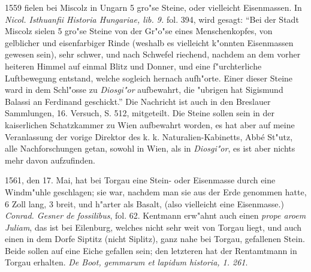 \documentclass[a4paper, 11pt, oneside, polutonikogreek, german]{article}
\begin{document}
1559 fielen bei Miscolz in Ungarn 5 gro"se Steine, oder vielleicht Eisenmassen. In \emph{Nicol. Isthuanfii Historia Hungariae, lib. 9.} fol. 394, wird gesagt: "`Bei der Stadt Miscolz sielen 5 gro"se Steine von der Gr"o"se eines Menschenkopfes, von gelblicher und eisenfarbiger Rinde (weshalb es vielleicht k"onnten Eisenmassen gewesen sein), sehr schwer, und nach Schwefel riechend, nachdem an dem vorher heiteren Himmel auf einmal Blitz und Donner, und eine f"urchterliche Luftbewegung entstand, welche sogleich hernach aufh"orte. Einer dieser Steine ward in dem Schl"osse zu \emph{Diosgi"or} aufbewahrt, die "ubrigen hat Sigismund Balassi an Ferdinand geschickt."' Die Nachricht ist auch in den Breslauer Sammlungen, 16. Versuch, S. 512, mitgeteilt. Die Steine sollen sein in der kaiserlichen Schatzkammer zu Wien aufbewahrt worden, es hat aber auf meine Veranlassung der vorige Direktor des k. k. Naturalien-Kabinetts, Abbé St"utz, alle Nachforschungen getan, sowohl in Wien, als in \emph{Diosgi"or}, es ist aber nichts mehr davon aufzufinden.

1561, den 17. Mai, hat bei Torgau eine Stein- oder Eisenmasse durch eine Windm"uhle geschlagen; sie war, nachdem man sie aus der Erde genommen hatte, 6 Zoll lang, 3 breit, und h"arter als Basalt, (also vielleicht eine Eisenmasse.) \emph{Conrad. Gesner de fossilibus}, fol. 62. Kentmann erw"ahnt auch einen \emph{prope aroem Juliam}, das ist bei Eilenburg, welches nicht sehr weit von Torgau liegt, und auch einen in dem Dorfe Siptitz (nicht Siplitz), ganz nahe bei Torgau, gefallenen Stein. Beide sollen auf eine Eiche gefallen sein; den letzteren hat der Rentamtmann in Torgau erhalten. \emph{De Boot, gemmarum et lapidum historia, 1. 261}.
\end{document}
